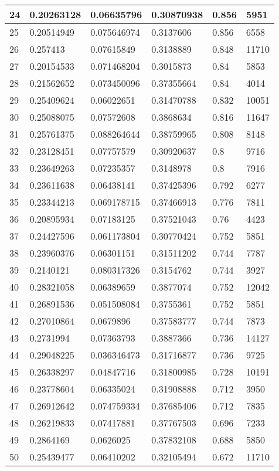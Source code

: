 \begin{longtable}{|l|l|l|l|l|l|}
24 & 0.20263128 & 0.06635796 & 0.30870938 & 0.856 & 5951 \\ \hline 
25 & 0.20514949 & 0.075646974 & 0.3137606 & 0.856 & 6558 \\ \hline 
26 & 0.257413 & 0.07615849 & 0.3138889 & 0.848 & 11710 \\ \hline 
27 & 0.20154533 & 0.071468204 & 0.3015873 & 0.84 & 5853 \\ \hline 
28 & 0.21562652 & 0.073450096 & 0.37355664 & 0.84 & 4014 \\ \hline 
29 & 0.25409624 & 0.06022651 & 0.31470788 & 0.832 & 10051 \\ \hline 
30 & 0.25088075 & 0.07572608 & 0.3868634 & 0.816 & 11647 \\ \hline 
31 & 0.25761375 & 0.088264644 & 0.38759965 & 0.808 & 8148 \\ \hline 
32 & 0.23128451 & 0.07757579 & 0.30920637 & 0.8 & 9716 \\ \hline 
33 & 0.23649263 & 0.07235357 & 0.3148978 & 0.8 & 7916 \\ \hline 
34 & 0.23611638 & 0.06438141 & 0.37425396 & 0.792 & 6277 \\ \hline 
35 & 0.23344213 & 0.069178715 & 0.37466913 & 0.776 & 7811 \\ \hline 
36 & 0.20895934 & 0.07183125 & 0.37521043 & 0.76 & 4423 \\ \hline 
37 & 0.24427596 & 0.061173804 & 0.30770424 & 0.752 & 5851 \\ \hline 
38 & 0.23960376 & 0.06301151 & 0.31511202 & 0.744 & 7787 \\ \hline 
39 & 0.2140121 & 0.080317326 & 0.3154762 & 0.744 & 3927 \\ \hline 
40 & 0.28321058 & 0.06389659 & 0.3877074 & 0.752 & 12042 \\ \hline 
41 & 0.26891536 & 0.051508084 & 0.3755361 & 0.752 & 5851 \\ \hline 
42 & 0.27010864 & 0.0679896 & 0.37583777 & 0.744 & 7873 \\ \hline 
43 & 0.2731994 & 0.07363793 & 0.3887366 & 0.736 & 14127 \\ \hline 
44 & 0.29048225 & 0.036346473 & 0.31716877 & 0.736 & 9725 \\ \hline 
45 & 0.26338297 & 0.04847716 & 0.31800985 & 0.728 & 10191 \\ \hline 
46 & 0.23778604 & 0.06335024 & 0.31908888 & 0.712 & 3950 \\ \hline 
47 & 0.26912642 & 0.074759334 & 0.37685406 & 0.712 & 7835 \\ \hline 
48 & 0.26219833 & 0.07417881 & 0.37767503 & 0.696 & 7233 \\ \hline 
49 & 0.2864169 & 0.0626025 & 0.37832108 & 0.688 & 5850 \\ \hline 
50 & 0.25439477 & 0.06410202 & 0.32105494 & 0.672 & 11710 \\ \hline 
\end{longtable}